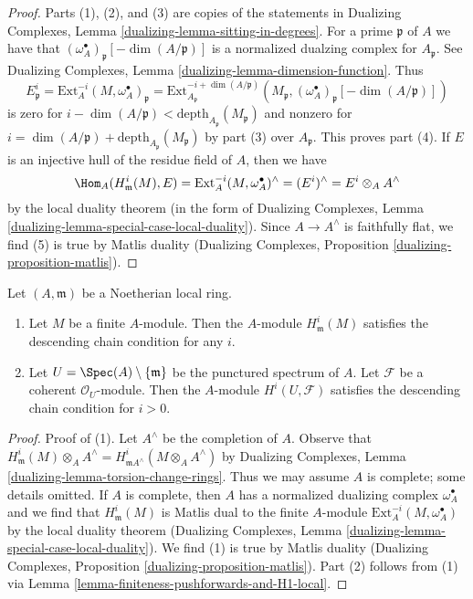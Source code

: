 \begin{proof}
Parts (1), (2), and (3) are copies of the statements in
Dualizing Complexes, Lemma \ref{dualizing-lemma-sitting-in-degrees}.
For a prime $\mathfrak p$ of $A$ we have that
$(\omega_A^\bullet)_\mathfrak p[-\dim(A/\mathfrak p)]$
is a normalized dualzing complex for $A_\mathfrak p$.
See Dualizing Complexes, Lemma \ref{dualizing-lemma-dimension-function}.
Thus
$$
E^i_\mathfrak p =
\text{Ext}^{-i}_A(M, \omega_A^\bullet)_\mathfrak p =
\text{Ext}^{-i + \dim(A/\mathfrak p)}_{A_\mathfrak p}
(M_\mathfrak p, (\omega_A^\bullet)_\mathfrak p[-\dim(A/\mathfrak p)])
$$
is zero for
$i - \dim(A/\mathfrak p) < \text{depth}_{A_\mathfrak p}(M_\mathfrak p)$
and nonzero for
$i = \dim(A/\mathfrak p) + \text{depth}_{A_\mathfrak p}(M_\mathfrak p)$
by part (3) over $A_\mathfrak p$.
This proves part (4).
If $E$ is an injective hull of the residue field of $A$, then we have
$$
\Hom_A(H^i_\mathfrak m(M), E) =
\text{Ext}^{-i}_A(M, \omega_A^\bullet)^\wedge =
(E^i)^\wedge =
E^i \otimes_A A^\wedge
$$
by the local duality theorem (in the form of
Dualizing Complexes, Lemma \ref{dualizing-lemma-special-case-local-duality}).
Since $A \to A^\wedge$ is faithfully flat, we find (5) is true by
Matlis duality
(Dualizing Complexes, Proposition \ref{dualizing-proposition-matlis}).
\end{proof}

\begin{lemma}
\label{lemma-descending-chain}
Let $(A, \mathfrak m)$ be a Noetherian local ring.
\begin{enumerate}
\item Let $M$ be a finite $A$-module. Then the $A$-module
$H^i_\mathfrak m(M)$ satisfies the descending chain condition
for any $i$.
\item Let $U = \Spec(A) \setminus \{\mathfrak m\}$ be the
punctured spectrum of $A$.
Let $\mathcal{F}$ be a coherent $\mathcal{O}_U$-module.
Then the $A$-module $H^i(U, \mathcal{F})$
satisfies the descending chain condition for $i > 0$.
\end{enumerate}
\end{lemma}

\begin{proof}
Proof of (1). Let $A^\wedge$ be the completion of $A$. Observe that
$H^i_\mathfrak m(M) \otimes_A A^\wedge =
H^i_{\mathfrak mA^\wedge}(M \otimes_A A^\wedge)$ by
Dualizing Complexes, Lemma \ref{dualizing-lemma-torsion-change-rings}.
Thus we may assume $A$ is complete; some details omitted.
If $A$ is complete, then $A$ has a normalized dualizing complex
$\omega_A^\bullet$ and we find that $H^i_\mathfrak m(M)$ is
Matlis dual to the finite $A$-module $\text{Ext}^{-i}_A(M, \omega_A^\bullet)$
by the local duality theorem (Dualizing Complexes, Lemma
\ref{dualizing-lemma-special-case-local-duality}).
We find (1) is true by Matlis duality
(Dualizing Complexes, Proposition \ref{dualizing-proposition-matlis}).
Part (2) follows from (1) via
Lemma \ref{lemma-finiteness-pushforwards-and-H1-local}.
\end{proof}

